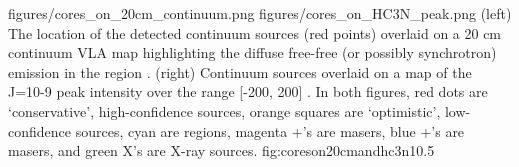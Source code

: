 \documentclass[twocolumn]{aastex61}
\begin{document}

% 
% 


%

\FigureTwo
{figures/cores_on_20cm_continuum.png}
{figures/cores_on_HC3N_peak.png}
{(left) The location of the detected continuum sources (red points) overlaid on a 20
cm continuum VLA map highlighting the diffuse free-free (or possibly
synchrotron) emission in the region \citep{Yusef-Zadeh2004a}.
(right) Continuum sources overlaid on a map
of the \cyanoacetylene J=10-9 peak intensity over the range [-200, 200] \kms.
  In both figures, red
dots are `conservative',
high-confidence sources, orange squares are `optimistic', low-confidence sources,
cyan are \hii regions, magenta +'s are \methanol masers, blue +'s are \water
masers, and green X's are X-ray sources.
}
{fig:coreson20cmandhc3n}{1}{0.5\textwidth}
\end{document}
